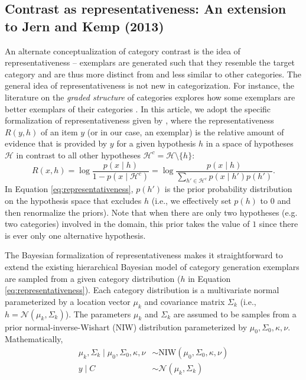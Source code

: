 \documentclass[pdflatex,sn-apa]{sn-jnl}%
\theoremstyle{thmstyleone}%
\theoremstyle{thmstyletwo}%
\theoremstyle{thmstylethree}%
\begin{document}
\subsection{Contrast as representativeness: An extension to Jern and Kemp
(2013)}
\label{section:representativeness-definition}

An alternate conceptualization of category contrast is the idea of
representativeness -- exemplars are generated such that they resemble the target
category and are thus more distinct from and less similar to other categories.
The general idea of representativeness is not new in categorization. For
instance, the literature on the \emph{graded structure} of categories explores
how some exemplars are better exemplars of their categories
\citep{palmeri2001central,barsalou1985ideals}. In this article, we adopt the
specific formalization of representativeness given by \cite{tenenbaum01}, where
the representativeness $R(y,h)$ of an item $y$ (or in our case, an exemplar) is
the relative amount of evidence that is provided by $y$ for a given hypothesis
$h$ in a space of hypotheses $\mathcal{H}$ in contrast to all other hypotheses
$\mathcal{H}^c=\mathcal{H} \setminus \{h\}$:
\begin{equation}
R(x,h) = \log \frac{p(x \mid h)}{1-p(x \mid \mathcal{H}^c)} = \log \frac{p(x \mid h)}{\sum_{h'\in \mathcal{H}^c}{p(x \mid h')p(h')}} .
\label{eq:representativeness}
\end{equation}
In Equation \ref{eq:representativeness}, $p(h')$ is the prior probability
distribution on the hypothesis space that excludes $h$ (i.e., we effectively set
$p(h)$ to 0 and then renormalize the priors). Note that when there are only two
hypotheses (e.g. two categories) involved in the domain, this prior takes the
value of $1$ since there is ever only one alternative hypothesis.

The Bayesian formalization of representativeness makes it straightforward to
extend the existing hierarchical Bayesian model of category generation
exemplars are sampled from a given category distribution ($h$ in
Equation \ref{eq:representativeness}). Each category distribution is a
multivariate normal parameterized by a location vector $\mu_k$ and covariance
matrix $\Sigma_k$ (i.e., $h = \mathcal{N}(\mu_k,\Sigma_k)$). The parameters
$\mu_k$ and $\Sigma_k$ are assumed to be samples from a prior
normal-inverse-Wishart (NIW) distribution parameterized by
$\mu_0,\Sigma_0,\kappa,\nu$. Mathematically,
\begin{align}
  \mu_k, \Sigma_k \mid \mu_0,\Sigma_0,\kappa,\nu &\sim
                                              \textrm{NIW}(\mu_0,\Sigma_0,\kappa,\nu)
                                              \label{eq:mvnsample}\\
  y \mid C &\sim \mathcal{N}(\mu_k,\Sigma_k) \label{eq:exemplarsample}
\end{align}
\end{document}
